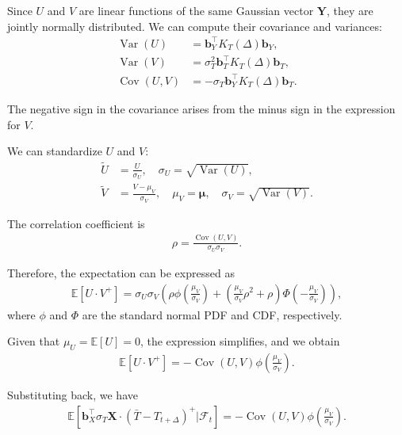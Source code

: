 \documentclass[10pt,a4paper,reqno]{amsart}
\theoremstyle{example}
\begin{document}
Since $U$ and $V$ are linear functions of the same Gaussian vector $\mathbf{Y}$, they are jointly normally distributed. We can compute their covariance and variances:
\begin{align}
\operatorname{Var}(U) &= \mathbf{b}_Y^\intercal K_T(\Delta) \mathbf{b}_Y, \\
\operatorname{Var}(V) &= \sigma_T^2 \mathbf{b}_T^\intercal K_T(\Delta) \mathbf{b}_T, \\
\operatorname{Cov}(U, V) &= -\sigma_T \mathbf{b}_Y^\intercal K_T(\Delta) \mathbf{b}_T.
\end{align}

The negative sign in the covariance arises from the minus sign in the expression for $V$.

We can standardize $U$ and $V$:
\begin{align}
\tilde{U} &= \frac{U}{\sigma_U}, \quad \sigma_U = \sqrt{\operatorname{Var}(U)}, \\
\tilde{V} &= \frac{V - \mu_V}{\sigma_V}, \quad \mu_V = \boldsymbol{\mu}, \quad \sigma_V = \sqrt{\operatorname{Var}(V)}.
\end{align}

The correlation coefficient is
\begin{align}
\rho = \frac{\operatorname{Cov}(U, V)}{\sigma_U \sigma_V}.
\end{align}

Therefore, the expectation can be expressed as
\begin{align}
\mathbb{E}\left[ U \cdot V^+ \right] = \sigma_U \sigma_V \left( \rho \phi\left( \frac{\mu_V}{\sigma_V} \right) + \left( \frac{\mu_V}{\sigma_V} \rho^2 + \rho \right) \Phi\left( -\frac{\mu_V}{\sigma_V} \right) \right),
\end{align}
where $\phi$ and $\Phi$ are the standard normal PDF and CDF, respectively.

Given that $\mu_U = \mathbb{E}[U] = 0$, the expression simplifies, and we obtain
\begin{align}
\mathbb{E}\left[ U \cdot V^+ \right] = -\operatorname{Cov}(U, V) \phi\left( \frac{\mu_V}{\sigma_V} \right).
\end{align}

Substituting back, we have
\begin{align}
\mathbb{E}\left[ \mathbf{b}_X^\intercal \sigma_T \mathbf{X} \cdot (\bar{T} - T_{t+\Delta})^+ \Bigg| \mathcal{F}_t \right] = -\operatorname{Cov}(U, V) \phi\left( \frac{\mu_V}{\sigma_V} \right).
\end{align}
\end{document}
